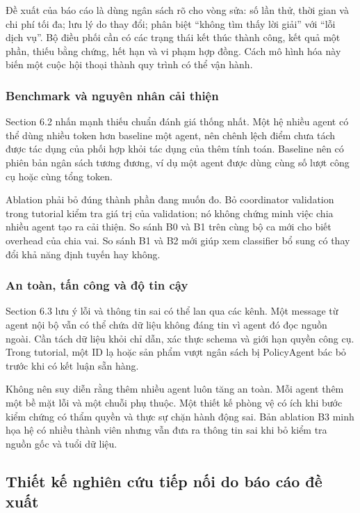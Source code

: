 Đề xuất của báo cáo là dùng ngân sách rõ cho vòng sửa: số lần thử, thời
gian và chi phí tối đa; lưu lý do thay đổi; phân biệt ``không tìm thấy
lời giải'' với ``lỗi dịch vụ''. Bộ điều phối cần có các trạng thái kết
thúc thành công, kết quả một phần, thiếu bằng chứng, hết hạn và vi phạm
hợp đồng. Cách mô hình hóa này biến một cuộc hội thoại thành quy trình
có thể vận hành.

\subsubsection{Benchmark và nguyên nhân cải
thiện}\label{benchmark-vuxe0-nguyuxean-nhuxe2n-cux1ea3i-thiux1ec7n}

Section 6.2 nhấn mạnh thiếu chuẩn đánh giá thống nhất. Một hệ nhiều
agent có thể dùng nhiều token hơn baseline một agent, nên chênh lệch
điểm chưa tách được tác dụng của phối hợp khỏi tác dụng của thêm tính
toán. Baseline nên có phiên bản ngân sách tương đương, ví dụ một agent
được dùng cùng số lượt công cụ hoặc cùng tổng token.

Ablation phải bỏ đúng thành phần đang muốn đo. Bỏ coordinator validation
trong tutorial kiểm tra giá trị của validation; nó không chứng minh việc
chia nhiều agent tạo ra cải thiện. So sánh B0 và B1 trên cùng bộ ca mới
cho biết overhead của chia vai. So sánh B1 và B2 mới giúp xem classifier
bổ sung có thay đổi khả năng định tuyến hay không.

\subsubsection{An toàn, tấn công và độ tin
cậy}\label{an-touxe0n-tux1ea5n-cuxf4ng-vuxe0-ux111ux1ed9-tin-cux1eady}

Section 6.3 lưu ý lỗi và thông tin sai có thể lan qua các kênh. Một
message từ agent nội bộ vẫn có thể chứa dữ liệu không đáng tin vì agent
đó đọc nguồn ngoài. Cần tách dữ liệu khỏi chỉ dẫn, xác thực schema và
giới hạn quyền công cụ. Trong tutorial, một ID lạ hoặc sản phẩm vượt
ngân sách bị PolicyAgent bác bỏ trước khi có kết luận sẵn hàng.

Không nên suy diễn rằng thêm nhiều agent luôn tăng an toàn. Mỗi agent
thêm một bề mặt lỗi và một chuỗi phụ thuộc. Một thiết kế phòng vệ có ích
khi bước kiểm chứng có thẩm quyền và thực sự chặn hành động sai. Bản
ablation B3 minh họa hệ có nhiều thành viên nhưng vẫn đưa ra thông tin
sai khi bỏ kiểm tra nguồn gốc và tuổi dữ liệu.

\subsection{Thiết kế nghiên cứu tiếp nối do báo cáo đề
xuất}\label{thiux1ebft-kux1ebf-nghiuxean-cux1ee9u-tiux1ebfp-nux1ed1i-do-buxe1o-cuxe1o-ux111ux1ec1-xuux1ea5t}

